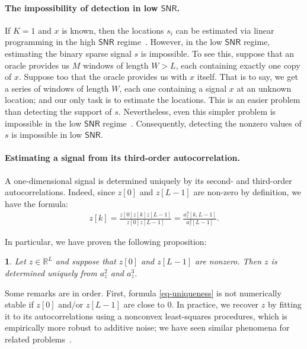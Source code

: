 \documentclass[english,11pt]{article}
\newcommand{\1}{\mathbf{1}}
\newcommand{\TODO}[1]{{\color{red}{[#1]}}}
\numberwithin{equation}{section}
\theoremstyle{plain}
\theoremstyle{definition}
\theoremstyle{remark}
\theoremstyle{plain}
\theoremstyle{remark}
\theoremstyle{plain}
\theoremstyle{plain}
\newtheorem{proposition}[thm]{\protect\propositionname}
\providecommand{\propositionname}{Proposition}
\newcommand{\RL}{\mathbb{R}^L}
\newcommand{\SNR}{\ensuremath{\textsf{SNR}}}
\begin{document}
\paragraph{The impossibility of detection in low $\SNR$.}
If $K=1$ and $x$ is known, then the locations $s_i$ can be estimated via linear programming  in the high $\SNR$ regime~\cite{azais2015spike,denoyelle2017support,bendory2016robust,bendory2017robust,bernstein2017deconvolution}. However, in the low $\SNR$ regime, estimating the binary sparse signal $s$ is impossible. To see this, suppose that an oracle provides us $M$ windows of length $W>L$, each containing exactly one copy of $x$. Suppose too that the oracle provides us with $x$ itself. That is to say, we get a series of windows of length $W$, each one containing a signal $x$ at an unknown location; and our only task is to estimate the locations. This is an easier problem than detecting the support of $s$. Nevertheless, even this simpler problem is impossible in the low $\SNR$ regime~\cite{aguerrebere2016fundamental}. Consequently, detecting the nonzero values of $s$ is impossible in low $\SNR$.

\TODO{Here we should give the Will's proposition for the impossibility of detection}

\paragraph{Estimating a signal from its third-order autocorrelation.}

A one-dimensional signal is determined uniquely by its second- and third-order autocorrelations. Indeed, since $z[0]$ and $z[L-1]$ are non-zero by definition, we have the formula:
%
\begin{align} \label{eq-uniqueness}
%
z[k] = \frac{z[0]z[k]z[L-1]}{z[0]z[L-1]} = \frac{a_z^3[k,L-1]}{a_z^2[L-1]}.
%
\end{align}

In particular, we have proven the following proposition:

\begin{proposition} \label{prop:uniqueness}
	Let $z\in\RL$ and suppose that $z[0]$ and $z[L-1]$ are nonzero. Then $z$ is determined uniquely from  $a_z^2$ and $a_z^3$.
\end{proposition}

Some remarks are in order. First, formula \eqref{eq-uniqueness} is not numerically stable if $z[0]$ and/or $z[L-1]$ are close to 0. In practice, we recover $z$ by fitting it to its autocorrelations using a nonconvex least-squares procedures, which is empirically more robust to additive noise; we have seen similar phenomena for related problems~\cite{bendory2017bispectrum,boumal2017heterogeneous}.
\end{document}
